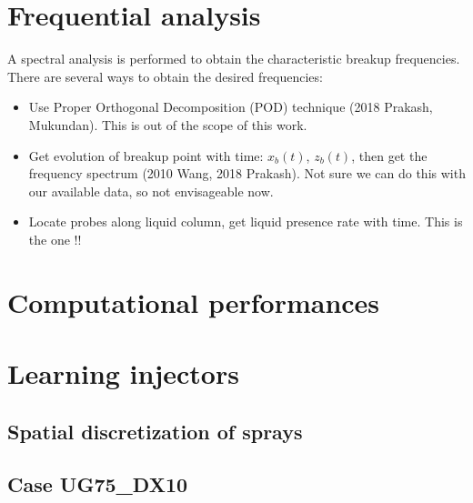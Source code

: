 \section{Frequential analysis}

A spectral analysis is performed to obtain the characteristic breakup frequencies. There are several ways to obtain the desired frequencies:

\begin{itemize}

	\item Use Proper Orthogonal Decomposition (POD) technique (2018 Prakash, Mukundan). This is out of the scope of this work.
	
	\item Get evolution of breakup point with time: $x_b \left( t \right)$, $z_b \left( t \right)$, then get the frequency spectrum  (2010 Wang, 2018 Prakash). Not sure we can do this with our available data, so not envisageable now.
	
	\item Locate probes along liquid column, get liquid presence rate with time. This is the one !!

\end{itemize}

\section{Computational performances}
\label{subsec:ch5_computational_performances}


\section{Learning injectors}



\subsection{Spatial discretization of sprays}

\clearpage

\subsection{Case UG75\_DX10}



